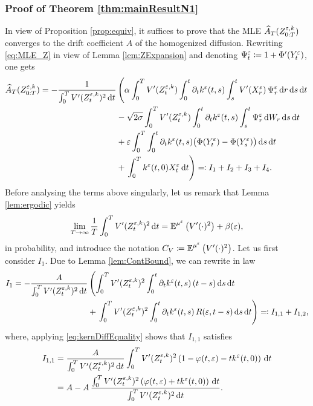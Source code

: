 \documentclass[10pt]{article}
\begin{document}
\subsubsection{Proof of Theorem \ref{thm:mainResultN1}}

In view of Proposition \ref{prop:equiv}, it suffices to prove that the MLE $\widehat A_T (Z^{\varepsilon,k}_{0:T})$ converges to the drift coefficient $A$ of the homogenized diffusion. Rewriting \eqref{eq:MLE_Z} in view of Lemma \ref{lem:ZExpansion} and denoting $\Psi^\varepsilon_t \coloneqq 1 + \Phi'(Y_t^\varepsilon)$, one gets
\begin{equation}
\begin{aligned}
	 \widehat A_T (Z^{\varepsilon,k}_{0:T}) = -\frac{1}{\int_0^T V'(Z^{\varepsilon,k}_t)^2 \,\mathrm{d} t} &\left(\alpha \int_0^T V'(Z^{\varepsilon,k}_t) \int_0^t \partial_t k^\varepsilon(t, s) \int_s^t  V'(X^\varepsilon_r)\, \Psi^\varepsilon_r\,\mathrm{d} r \,\mathrm{d} s \,\mathrm{d} t\right.\\
	 &-\sqrt{2\sigma} \int_0^T V'(Z^{\varepsilon,k}_t) \int_0^t \partial_t k^\varepsilon(t, s)  \int_s^t \Psi^\varepsilon_r \,\mathrm{d} W_r \,\mathrm{d} s \,\mathrm{d} t\\
	 &+\varepsilon \int_0^T \int_0^t \partial_t k^\varepsilon(t, s) \big(\Phi(Y^\varepsilon_t)- \Phi(Y^\varepsilon_s)\big) \,\mathrm{d} s \,\mathrm{d} t\\
	 &+ \left. \int_0^T k^\varepsilon(t, 0) X^\varepsilon_t \,\mathrm{d} t \right) \eqqcolon I_1 + I_2 + I_3 + I_4.
\end{aligned}
\end{equation}
Before analysing the terms above singularly, let us remark that Lemma \ref{lem:ergodic} yields
\begin{equation}
	 \lim_{T\to\infty} \frac1T \int_0^T V'(Z^{\varepsilon,k}_t)^2 \,\mathrm{d} t = \operatorname{\mathbb{E}}^{\mu^\varepsilon} \left(V'(\cdot)^2\right) + \beta(\varepsilon),
\end{equation}
in probability, and introduce the notation $ C_V \coloneqq \operatorname{\mathbb{E}}^{\mu^\varepsilon} \left(V'(\cdot)^2\right)$.
Let us first consider $I_1$. Due to Lemma \ref{lem:ContBound}, we can rewrite in law
\begin{equation}
\begin{aligned}
	I_1 = -\frac{A}{\int_0^T V'(Z^{\varepsilon,k}_t)^2 \,\mathrm{d} t} &\left(\int_0^T V'(Z^{\varepsilon,k}_t)^2 \int_0^t \partial_t k^\varepsilon(t, s) \, (t - s) \,\mathrm{d} s \,\mathrm{d} t \right. \\
	&+ \left. \int_0^T V'(Z^{\varepsilon,k}_t)^2 \int_0^t \partial_t k^\varepsilon(t, s) \, R(\varepsilon, t-s) \,\mathrm{d} s \,\mathrm{d} t \right) \eqqcolon I_{1,1} + I_{1,2},
\end{aligned}
\end{equation}
where, applying \eqref{eq:kernDiffEquality} shows that $I_{1,1}$ satisfies
\begin{equation}
\begin{aligned}
	I_{1,1} &= \frac{A}{\int_0^T V'(Z^{\varepsilon,k}_t)^2 \,\mathrm{d} t} \int_0^T V'(Z^{\varepsilon,k}_t)^2 \left(1 - \varphi(t, \varepsilon) - t k^\varepsilon(t, 0) \right) \,\mathrm{d} t\\
	&= A - A \, \frac{\int_0^T V'(Z^{\varepsilon,k}_t)^2 \left(\varphi(t, \varepsilon) + t k^\varepsilon(t, 0) \right) \,\mathrm{d} t}{\int_0^T V'(Z^{\varepsilon,k}_t)^2 \,\mathrm{d} t}.
\end{aligned}
\end{equation}
\end{document}
